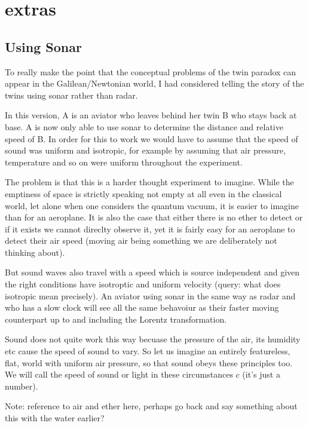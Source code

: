 \documentclass[a4paper]{report}
\begin{document}
\section*{extras}


\subsection*{Using Sonar}
To really make the point that the conceptual problems of the twin paradox can appear in the Galilean/Newtonian world, I had considered telling the story of the twins using sonar rather than radar.

In this version, A is an aviator who leaves behind her twin B who stays back at base. A is now only able to use sonar to determine the distance and relative speed of B. In order for this to work we would have to assume that the speed of sound was uniform and isotropic, for example by assuming that air pressure, temperature and so on were uniform throughout the experiment.

The problem is that this is a harder thought experiment to imagine. While the emptiness of space is strictly speaking not empty at all even in the classical world, let alone when one considers the quantum vacuum, it is easier to imagine than for an aeroplane. It is also the case that either there is no ether to detect or if it exists we cannot direclty observe it, yet it is fairly easy for an aeroplane to detect their air speed (moving air being something we are deliberately not thinking about).

But sound waves also travel with a speed which is source independent and given the right conditions have isotroptic and uniform velocity (query: what does isotropic mean precisely). An aviator using sonar in the same way as radar and who has a slow clock will see all the same behavoiur as their faster moving counterpart up to and including the Lorentz transformation. 

Sound does not quite work this way becuase the pressure of the air, its humidity etc cause the speed of sound to vary. So let us imagine an entirely featureless, flat, world with uniform air pressure, so that sound obeys these principles too. We will call the speed of sound or light in these circumstances $c$ (it's just a number).

Note: reference to air and ether here, perhaps go back and say something about this with the water earlier?
\end{document}
